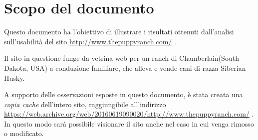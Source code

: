 \documentclass[../rapporto-usabilita.tex]{subfiles}
\begin{document}
\section{Scopo del documento}
	Questo documento ha l'obiettivo di illustrare i risultati ottenuti dall'analisi sull'usabilità del sito \url{http://www.thepuppyranch.com/}  .
	
	Il sito in questione funge da vetrina web per un ranch di Chamberlain(South Dakota, USA) a conduzione familiare, che alleva e vende cani di razza Siberian Husky.
	
	A supporto delle osservazioni esposte in questo documento, è stata creata una \textit{copia cache} dell'intero sito, raggiungibile all'indirizzo \url{https://web.archive.org/web/20160619090020/http://www.thepuppyranch.com/} . In questo modo sarà possibile visionare il sito anche nel caso in cui venga rimosso o modificato.
	
	
\end{document}
